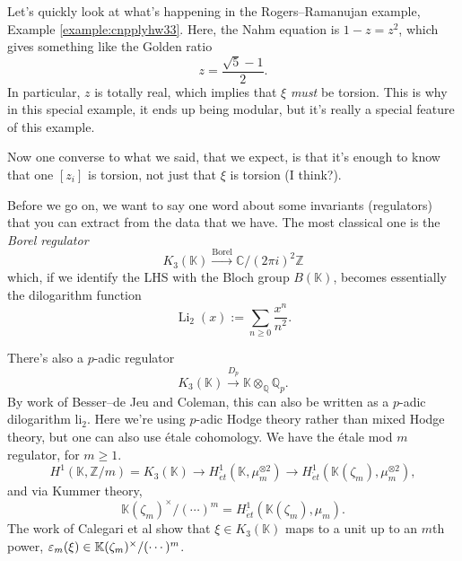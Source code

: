 \documentclass[reqno]{amsart} 
\begin{document}
Let's quickly look at what's happening in the Rogers--Ramanujan example, Example \ref{example:cnpplyhw33}.  Here, the Nahm equation is $1 - z = z^2$, which gives something like the Golden ratio
\begin{equation*}
  z = \frac{\sqrt{5} - 1}{2}.
\end{equation*}
In particular, $z$ is totally real, which implies that $\xi$ \emph{must} be torsion.  This is why in this special example, it ends up being modular, but it's really a special feature of this example.

Now one converse to what we said, that we expect, is that it's enough to know that one $[z_i]$ is torsion, not just that $\xi$ is torsion (I think?).

Before we go on, we want to say one word about some invariants (regulators) that you can extract from the data that we have.  The most classical one is the \emph{Borel regulator}
\begin{equation*}
  K_3(\mathbb{K}) \xrightarrow{\mathrm{Borel}} \mathbb{C} /(2 \pi i)^2 \mathbb{Z}
\end{equation*}
which, if we identify the LHS with the Bloch group $B(\mathbb{K})$, becomes essentially the dilogarithm function
\begin{equation*}
  \operatorname{Li}_2 (x) := \sum_{n \geq 0}
  \frac{x^n}{n^2}.
\end{equation*}

There's also a $p$-adic regulator
\begin{equation*}
  K_3(\mathbb{K}) \xrightarrow{D_p} \mathbb{K} \otimes_{\mathbb{Q}} \mathbb{Q}_p.
\end{equation*}
By work of Besser--de Jeu and Coleman, this can also be written as a $p$-adic dilogarithm $\mathrm{li}_2$.  Here we're using $p$-adic Hodge theory rather than mixed Hodge theory, but one can also use {\'e}tale cohomology.  We have the {\'e}tale mod $m$ regulator, for $m \geq 1$.
\begin{equation*}
  H^1(\mathbb{K}, \mathbb{Z} / m)
  = K_3(\mathbb{K}) \rightarrow H_{\acute{e} t}^1(\mathbb{K}, \mu_m^{\otimes 2})
  \rightarrow H_{\acute{e}t}^1(\mathbb{K}(\zeta_m), \mu_m^{\otimes 2}),
\end{equation*}
and via Kummer theory,
\begin{equation*}
  \mathbb{K}(\zeta_m)^\times /(\dotsb)^m = H_{\acute{e}t}^1(\mathbb{K}(\zeta_m), \mu_m).
\end{equation*}
The work of Calegari et al show that $\xi \in K_3(\mathbb{K})$ maps to a unit up to an $m$th power, $\varepsilon_m(\xi) \in \mathbb{K}(\zeta_m)^\times /(\dotsb)^m$.
\end{document}
